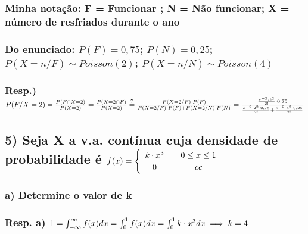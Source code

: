 \documentclass[portuguese]{article}
\begin{document}
\subsubsection*{\textmd{Minha notação: F = Funcionar ; N = Não funcionar; X = número
de resfriados durante o ano}}


\subsubsection*{\textmd{Do enunciado: $P(F)=0,75$; $P(N)=0,25$; $P(X=n/F)\sim Poisson(2)$;
$P(X=n/N)\sim Poisson(4)$}}


\subsubsection*{\textmd{Resp.) $P(F/X=2)=\frac{P(F\cap X=2)}{P(X=2)}=\frac{P(X=2\cap F)}{P(X=2)}\protect\overset{7}{=}\frac{P(X=2/F)\cdot P(F)}{P(X=2/F)\cdot P(F)+P(X=2/N)\cdot P(N)}=\frac{\frac{e^{-2}\cdot2^{2}}{2!}\cdot0,75}{\frac{e^{-2}\cdot2^{2}\cdot0,75}{2!}+\frac{e^{-2}\cdot4^{2}\cdot0,25}{2!}}$}}

\textbf{\textcompwordmark{}}


\subsection*{\textmd{5) Seja X a v.a. contínua cuja densidade de probabilidade
é $f(x)=\protect\begin{cases}
\protect\begin{array}{c}
k\cdot x^{3}\protect\\
0
\protect\end{array} & \protect\begin{array}{c}
0\leq x\leq1\protect\\
cc
\protect\end{array}\protect\end{cases}$}}


\subsubsection*{\textmd{a) Determine o valor de k}}


\subsubsection*{\textmd{Resp. a) $1=\int_{-\infty}^{\infty}f(x)dx=\int_{0}^{1}f(x)dx=\int_{0}^{1}k\cdot x^{3}dx\protect\implies k=4$}}
\end{document}
